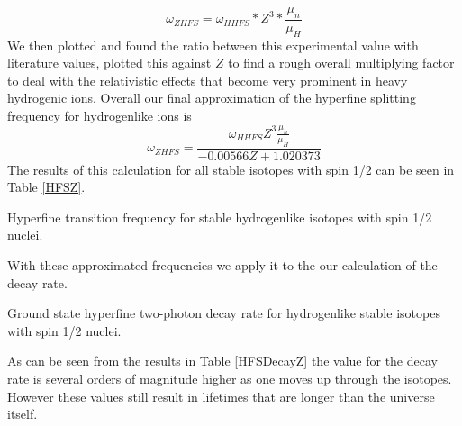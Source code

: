 \begin{equation}
    \omega_{ZHFS}=\omega_{HHFS}*Z^3*\frac{\mu_n}{\mu_H}
\end{equation}
We then plotted and found the ratio between this experimental value with literature values, plotted this against $Z$ to find a rough overall multiplying factor to deal with the relativistic effects that become very prominent in heavy hydrogenic ions. Overall our final approximation of the hyperfine splitting frequency for hydrogenlike ions is
\begin{equation}
    \omega_{ZHFS}=\frac{\omega_{HHFS}Z^3\frac{\mu_n}{\mu_H}}{-0.00566Z+1.020373}
\end{equation}
 The results of this calculation for all stable isotopes with spin 1/2 can be seen in Table \ref{HFSZ}.

\begin{table}[h!]
  \begin{center}
    \caption{Hyperfine transition frequency for stable hydrogenlike isotopes with spin 1/2 nuclei.}
    \label{HFSZ}
  \end{center}
\end{table}
With these approximated frequencies we apply it to the our calculation of the decay rate.
\begin{table}[h!]
  \begin{center}
    \caption{Ground state hyperfine two-photon decay rate for hydrogenlike stable isotopes with spin 1/2 nuclei.}
    \label{HFSDecayZ}
  \end{center}
\end{table}
As can be seen from the results in Table \ref{HFSDecayZ} the value for the decay rate is several orders of magnitude higher as one moves up through the isotopes. However these values still result in lifetimes that are longer than the universe itself.

